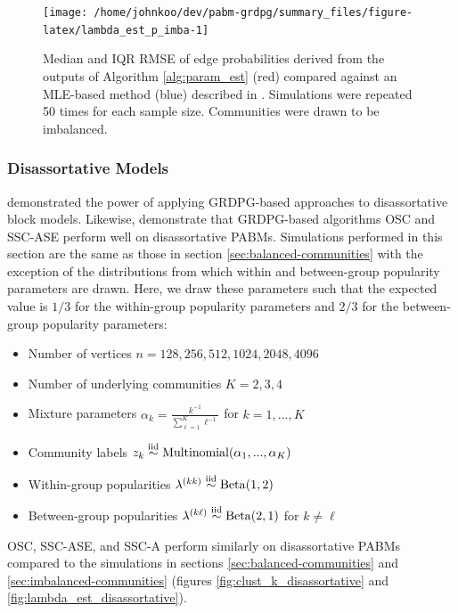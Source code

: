 \documentclass[
  11pt,
]{article}
\providecommand{\tightlist}{%
  \setlength{\itemsep}{0pt}\setlength{\parskip}{0pt}}
\theoremstyle{definition}
\theoremstyle{definition}
\theoremstyle{definition}
\theoremstyle{definition}
\theoremstyle{remark}
\begin{document}
\begin{figure}[H]
{\centering \texttt{[image: /home/johnkoo/dev/pabm-grdpg/summary\_files/figure-latex/lambda\_est\_p\_imba-1]}
}
\caption{Median and IQR RMSE of edge probabilities derived from the
  outputs of Algorithm \ref{alg:param_est} (red) compared against an
  MLE-based method (blue) described in
  \cite{307cbeb9b1be48299388437423d94bf1}.
  Simulations were repeated 50 times for each sample size. Communities were drawn to be imbalanced.}
\label{fig:lambda_est_p_imba}
\end{figure}

\hypertarget{sec:disassortative-models}{%
\subsubsection{Disassortative Models}\label{sec:disassortative-models}}

\citet{rubindelanchy2017statistical} demonstrated the power of applying GRDPG-based approaches to disassortative block models.
Likewise, demonstrate that GRDPG-based algorithms OSC and SSC-ASE perform well on disassortative PABMs.
Simulations performed in this section are the same as those in section \ref{sec:balanced-communities} with the exception of the distributions from which within and between-group popularity parameters are drawn.
Here, we draw these parameters such that the expected value is \(1/3\) for the within-group popularity parameters and \(2/3\) for the between-group popularity parameters:

\begin{itemize}
\tightlist
\item
  Number of vertices \(n = 128, 256, 512, 1024, 2048, 4096\)
\item
  Number of underlying communities \(K = 2, 3, 4\)
\item
  Mixture parameters \(\alpha_k = \frac{k^{-1}}{\sum_{\ell=1}^K \ell^{-1}}\)
  for \(k = 1, ..., K\)
\item
  Community labels
  \(z_k \stackrel{\text{iid}}{\sim} \mathrm{Multinomial}(\alpha_1, ..., \alpha_K)\)
\item
  Within-group popularities
  \(\lambda^{(kk)} \stackrel{\text{iid}}{\sim} \mathrm{Beta}(1, 2)\)
\item
  Between-group popularities
  \(\lambda^{(k \ell)} \stackrel{\text{iid}}{\sim} \mathrm{Beta}(2, 1)\) for
  \(k \neq \ell\)
\end{itemize}

OSC, SSC-ASE, and SSC-A perform similarly on disassortative PABMs compared to the simulations in sections \ref{sec:balanced-communities} and \ref{sec:imbalanced-communities}
(figures \ref{fig:clust_k_disassortative} and \ref{fig:lambda_est_disassortative}).
\end{document}
